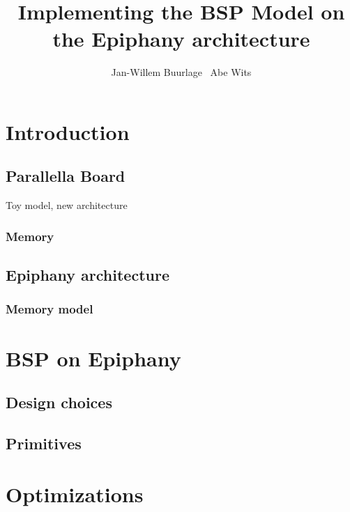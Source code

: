 \documentclass{article}
\title{Implementing the BSP Model on the Epiphany architecture}
\author{Jan-Willem Buurlage \ Abe Wits}
\renewcommand{\(}{\left(}
\renewcommand{\)}{\right)}
\begin{document}
\maketitle


\tableofcontents

\newpage

\setlength{\parskip}{0.2 cm}
\setlength{\parindent}{0.0 cm}

\section{Introduction}

\subsection{Parallella Board}

Toy model, new architecture

\subsubsection{Memory}

\subsection{Epiphany architecture}

\subsubsection{Memory model}

\section{BSP on Epiphany}

\subsection{Design choices}

\subsection{Primitives}

\section{Optimizations}
\end{document}
